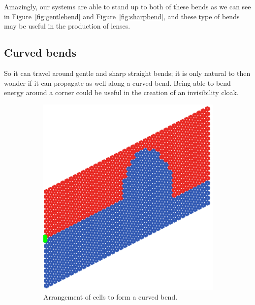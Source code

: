 Amazingly, our systems are able to stand up to both of these bends as we can see
in Figure~\ref{fig:gentlebend} and Figure~\ref{fig:sharpbend}, and these type
of bends may be useful in the production of lenses.\cite{negrefraclens}

\subsection{Curved bends}
So it can travel around gentle and sharp straight bends; it is only natural to
then wonder if it can propagate as well along a curved bend. Being able to bend
energy around a corner could be useful in the creation of an invisibility
cloak.\cite{emcloak}

\begin{figure}
\centering
\begin{subfigure}[b]{.5\textwidth}
  \centering
  \includegraphics[width=0.8\linewidth]{imgs/curvedbendarr.png}
  \caption{Arrangement of cells to form a curved bend.}
  \label{fig:sub1}
\end{subfigure}%
\begin{subfigure}[b]{.5\textwidth}
  \centering

\end{subfigure}
\end{figure}

